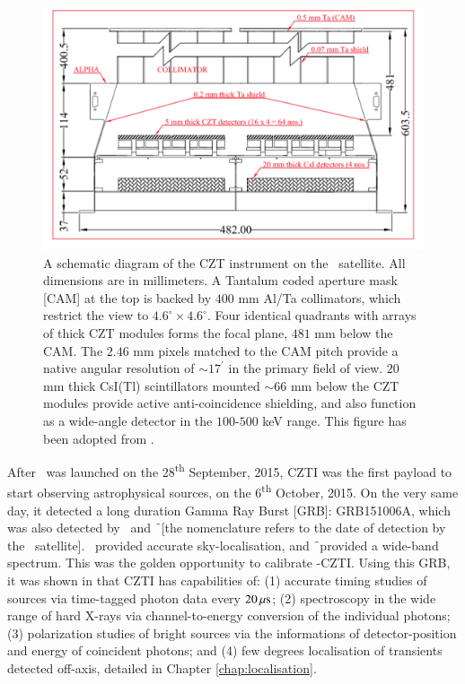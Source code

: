 \begin{figure}
\begin{center}
\includegraphics[scale=0.33]{GRB151006A--CZT}
\caption[Schematic diagram of \AS -CZTI]{A schematic diagram of the CZT instrument on the \AS\ satellite. All dimensions are in millimeters. A Tantalum coded aperture mask [CAM] at the top is backed by $400$ mm Al/Ta collimators, which restrict the view to $4.6^{\circ} \times 4.6^{\circ}$. Four identical quadrants with arrays of thick CZT modules forms the focal plane, $481$ mm below the CAM. The $2.46$ mm pixels matched to the CAM pitch provide a native angular resolution of $\sim 17^{'}$ in the primary field of view. $20$ mm thick CsI(Tl) scintillators mounted $\sim 66$ mm below the CZT modules provide active anti-coincidence shielding, and also function as a wide-angle detector in the $100$-$500$ keV range. This figure has been adopted from \cite{Rao_et_al.-2016-ApJ}.}
\label{fig:CZTI}
\end{center}
\end{figure}

After \AS\ was launched on the 28\textsuperscript{th} September, 2015, CZTI was the first payload to start observing astrophysical sources, on the 6\textsuperscript{th} October, 2015. On the very same day, it detected a long duration Gamma Ray Burst [GRB]: GRB151006A, which was also detected by \s\ and \f\ [the nomenclature refers to the date of detection by the \s\ satellite]. \s\ provided accurate sky-localisation, and \f\ provided a wide-band spectrum. This was the golden opportunity to calibrate \AS -CZTI. Using this GRB, it was shown in \cite{Rao_et_al.-2016-ApJ} that CZTI has capabilities of: (1) accurate timing studies of sources via time-tagged photon data every $20 \, {\rm \mu s}$; (2) spectroscopy in the wide range of hard X-rays via channel-to-energy conversion of the individual photons; (3) polarization studies of bright sources via the informations of detector-position and energy of coincident photons; and (4) few degrees localisation of transients detected off-axis, detailed in Chapter \ref{chap:localisation}.

